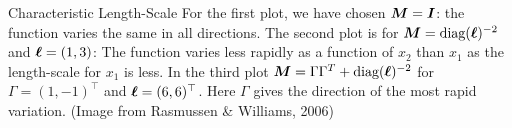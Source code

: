 \documentclass[11pt,compress,t,notes=noshow, xcolor=table]{beamer}
\begin{document}
\begin{frame}[c,allowframebreaks]{Characteristic Length-Scale}
\vspace{3mm}
For the first plot, we have chosen $\bm{M} = \bm{I}$: the function varies the same in all directions. The second plot is for $\bm{M} = \text{diag}(\bm{\ell})^{-2}$ and $\bm{\ell} = \left(1, 3 \right)$: The function varies less rapidly as a function of $x_2$ than $x_1$ as the length-scale for $x_1$ is less. In the third plot $\bm{M} = \Gamma \Gamma^T + \text{diag}(\bm{\ell})^{-2}$ for $\Gamma = (1, -1)^\top$ and $\bm{\ell} = (6, 6)^\top$. Here $\Gamma$ gives the direction of the most rapid variation. (Image from Rasmussen \& Williams, 2006)


\end{frame}

\endlecture
\end{document}
